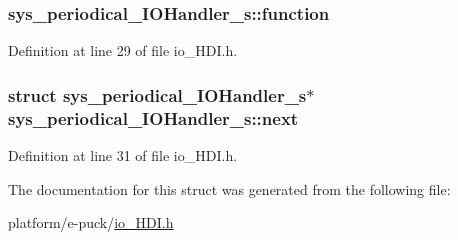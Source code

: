 \subsubsection[{function}]{ sys\+\_\+periodical\+\_\+\+I\+O\+Handler\+\_\+s\+::function}\label{structsys__periodical__IOHandler__s_af22c738940f827dc20853e9e0edc0a56}


Definition at line 29 of file io\+\_\+\+H\+D\+I.\+h.

\hypertarget{structsys__periodical__IOHandler__s_a36ad85ffbae299cfa418f69b6f2d745e}{}
\subsubsection[{next}]{\setlength{\rightskip}{0pt plus 5cm}struct {\bf sys\+\_\+periodical\+\_\+\+I\+O\+Handler\+\_\+s}$\ast$ sys\+\_\+periodical\+\_\+\+I\+O\+Handler\+\_\+s\+::next}\label{structsys__periodical__IOHandler__s_a36ad85ffbae299cfa418f69b6f2d745e}


Definition at line 31 of file io\+\_\+\+H\+D\+I.\+h.



The documentation for this struct was generated from the following file\+:\begin{DoxyCompactItemize}
\item 
platform/e-\/puck/\hyperlink{io__HDI_8h}{io\+\_\+\+H\+D\+I.\+h}\end{DoxyCompactItemize}
